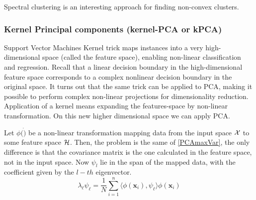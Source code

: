 \documentclass[12pt, letterpaper]{article}
\theoremstyle{definition}
\newcommand{\x}{\mathbf{x}}
\begin{document}
Spectral clustering is an interesting approach for finding non-convex clusters. 
\subsubsection{Kernel Principal components  (kernel-PCA or kPCA)}
\label{KPCA}
Support Vector Machines Kernel trick maps instances into a very high-dimensional space (called the feature space), enabling non-linear classification and regression. Recall that a linear decision boundary in the high-dimensional feature space corresponds to a complex nonlinear decision boundary in the original space.
It turns out that the same trick can be applied to PCA, making it possible to perform complex non-linear projections for dimensionality reduction. Application of a kernel means expanding the features-space by non-linear transformation. On this new higher dimensional space we can apply PCA.

Let $\phi(\dot)$ be a non-linear transformation mapping data from the input space $\CMcal{X}$ to some feature space $\CMcal{H}$. Then, the problem is the same of \ref{PCAmaxVar}, the only difference is that the covariance matrix is the one calculated in the feature space, not in the input space. Now $\psi_l$ lie in the span of the mapped data, with the coefficient given by the $l-th$ eigenvector.
\begin{equation}
\lambda_\ell\psi_\ell = \frac{1}{N}\sum_{i=1}^n \langle \phi(\x_i), \psi_\ell\rangle \phi(\x_i)
\end{equation}
\end{document}
